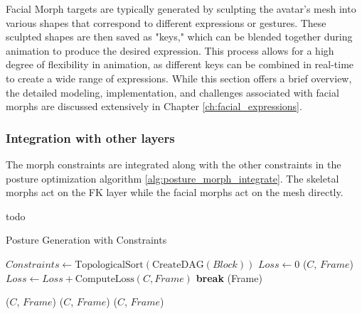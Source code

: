 \documentclass[../../main.tex]{subfiles}
\begin{document}
Facial Morph targets are typically generated by sculpting the avatar's mesh into various shapes that correspond to different expressions or gestures. These sculpted shapes are then saved as "keys," which can be blended together during animation to produce the desired expression. This process allows for a high degree of flexibility in animation, as different keys can be combined in real-time to create a wide range of expressions. While this section offers a brief overview, the detailed modeling, implementation, and challenges associated with facial morphs are discussed extensively in Chapter \ref{ch:facial_expressions}.

\subsubsection{Integration with other layers}
\label{ch:rigging_layers:proc_rig_signing_avatars:morph_constraints:intergation}

The morph constraints are integrated along with the other constraints in the posture optimization algorithm \ref{alg:posture_morph_integrate}. The skeletal morphs act on the FK layer while the facial morphs act on the mesh directly.

todo
\begin{algorithm}
    \caption{Posture Generation with Constraints}
    \label{alg:posture_morph_integrate}
    \begin{algorithmic}[1]    
            \State $Constraints \gets \text{TopologicalSort}(\text{CreateDAG}(Block))$
                    \State $Loss \gets 0$
                        \State {}($C$, $Frame$)
                        \State $Loss \gets Loss + \text{ComputeLoss}(C, Frame)$
                    \EndFor
                     \textbf{break} \EndIf
                \EndFor
                \State {}(Frame)
            \EndFor
        \EndFor
    \EndProcedure
    
         \State {}($C$, $Frame$)
         \State {}($C$, $Frame$)
         \State {}($C$, $Frame$)
        \EndIf
    \EndProcedure
    
    \end{algorithmic}
\end{algorithm}
\end{document}
